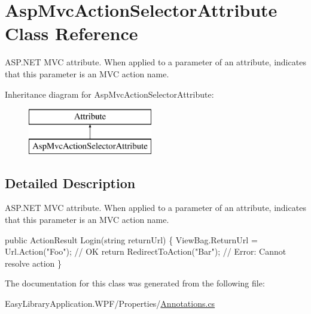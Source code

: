 \hypertarget{class_asp_mvc_action_selector_attribute}{}\section{Asp\+Mvc\+Action\+Selector\+Attribute Class Reference}
\label{class_asp_mvc_action_selector_attribute}


A\+S\+P.\+N\+ET M\+VC attribute. When applied to a parameter of an attribute, indicates that this parameter is an M\+VC action name.  


Inheritance diagram for Asp\+Mvc\+Action\+Selector\+Attribute\+:\begin{figure}[H]
\begin{center}
\leavevmode
\includegraphics[height=2.000000cm]{class_asp_mvc_action_selector_attribute}
\end{center}
\end{figure}


\subsection{Detailed Description}
A\+S\+P.\+N\+ET M\+VC attribute. When applied to a parameter of an attribute, indicates that this parameter is an M\+VC action name. 


\begin{DoxyCode}
\textcolor{keyword}{public} ActionResult Login(\textcolor{keywordtype}{string} returnUrl) \{
  ViewBag.ReturnUrl = Url.Action(\textcolor{stringliteral}{"Foo"}); \textcolor{comment}{// OK}
  \textcolor{keywordflow}{return} RedirectToAction(\textcolor{stringliteral}{"Bar"}); \textcolor{comment}{// Error: Cannot resolve action}
\}
\end{DoxyCode}


The documentation for this class was generated from the following file\+:\begin{DoxyCompactItemize}
\item 
Easy\+Library\+Application.\+W\+P\+F/\+Properties/\mbox{\hyperlink{_annotations_8cs}{Annotations.\+cs}}\end{DoxyCompactItemize}
